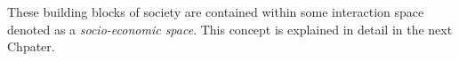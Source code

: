 \begin{subappendices}
These building blocks of society are contained within some interaction space denoted as a \emph{socio-economic space}. This concept is explained in detail in the next Chpater. 

\end{subappendices}


















